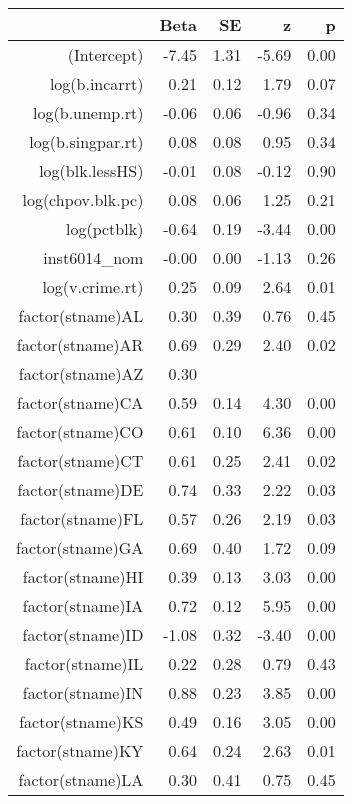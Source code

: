 \begin{table}[ht]
\centering
\begin{tabular}{rrrrr}
  \hline
 & Beta & SE & z & p \\ 
  \hline
(Intercept) & -7.45 & 1.31 & -5.69 & 0.00 \\ 
  log(b.incarrt) & 0.21 & 0.12 & 1.79 & 0.07 \\ 
  log(b.unemp.rt) & -0.06 & 0.06 & -0.96 & 0.34 \\ 
  log(b.singpar.rt) & 0.08 & 0.08 & 0.95 & 0.34 \\ 
  log(blk.lessHS) & -0.01 & 0.08 & -0.12 & 0.90 \\ 
  log(chpov.blk.pc) & 0.08 & 0.06 & 1.25 & 0.21 \\ 
  log(pctblk) & -0.64 & 0.19 & -3.44 & 0.00 \\ 
  inst6014\_nom & -0.00 & 0.00 & -1.13 & 0.26 \\ 
  log(v.crime.rt) & 0.25 & 0.09 & 2.64 & 0.01 \\ 
  factor(stname)AL & 0.30 & 0.39 & 0.76 & 0.45 \\ 
  factor(stname)AR & 0.69 & 0.29 & 2.40 & 0.02 \\ 
  factor(stname)AZ & 0.30 &  &  &  \\ 
  factor(stname)CA & 0.59 & 0.14 & 4.30 & 0.00 \\ 
  factor(stname)CO & 0.61 & 0.10 & 6.36 & 0.00 \\ 
  factor(stname)CT & 0.61 & 0.25 & 2.41 & 0.02 \\ 
  factor(stname)DE & 0.74 & 0.33 & 2.22 & 0.03 \\ 
  factor(stname)FL & 0.57 & 0.26 & 2.19 & 0.03 \\ 
  factor(stname)GA & 0.69 & 0.40 & 1.72 & 0.09 \\ 
  factor(stname)HI & 0.39 & 0.13 & 3.03 & 0.00 \\ 
  factor(stname)IA & 0.72 & 0.12 & 5.95 & 0.00 \\ 
  factor(stname)ID & -1.08 & 0.32 & -3.40 & 0.00 \\ 
  factor(stname)IL & 0.22 & 0.28 & 0.79 & 0.43 \\ 
  factor(stname)IN & 0.88 & 0.23 & 3.85 & 0.00 \\ 
  factor(stname)KS & 0.49 & 0.16 & 3.05 & 0.00 \\ 
  factor(stname)KY & 0.64 & 0.24 & 2.63 & 0.01 \\ 
  factor(stname)LA & 0.30 & 0.41 & 0.75 & 0.45 \\ 

\end{tabular}
\end{table}

